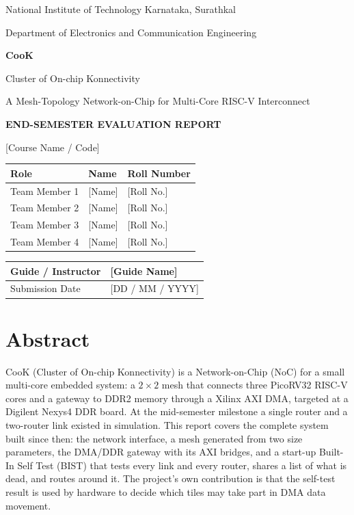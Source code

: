 \documentclass[11pt,a4paper]{article}
\begin{document}
\begin{titlepage}
\centering
{\large National Institute of Technology Karnataka, Surathkal\par}
{\large Department of Electronics and Communication Engineering\par}
\vspace{2.5cm}
{\Huge\bfseries CooK\par}
\vspace{0.3cm}
{\Large Cluster of On-chip Konnectivity\par}
\vspace{0.6cm}
{\large A Mesh-Topology Network-on-Chip for Multi-Core RISC-V Interconnect\par}
\vspace{1.5cm}
{\Large\bfseries END-SEMESTER EVALUATION REPORT\par}
\vspace{0.4cm}
{[Course Name / Code]\par}
\vspace{1.5cm}
\begin{tabular}{|l|l|l|}
\hline
\textbf{Role} & \textbf{Name} & \textbf{Roll Number} \\ \hline
Team Member 1 & [Name] & [Roll No.] \\ \hline
Team Member 2 & [Name] & [Roll No.] \\ \hline
Team Member 3 & [Name] & [Roll No.] \\ \hline
Team Member 4 & [Name] & [Roll No.] \\ \hline
\end{tabular}

\vspace{1cm}
\begin{tabular}{|l|l|}
\hline
Guide / Instructor & [Guide Name] \\ \hline
Submission Date & [DD / MM / YYYY] \\ \hline
\end{tabular}
\vfill
\end{titlepage}

\tableofcontents
\newpage

\section{Abstract}

CooK (Cluster of On-chip Konnectivity) is a Network-on-Chip (NoC) for a small
multi-core embedded system: a $2\times2$ mesh that connects three PicoRV32
RISC-V cores and a gateway to DDR2 memory through a Xilinx AXI DMA, targeted at
a Digilent Nexys4 DDR board. At the mid-semester milestone a single router and
a two-router link existed in simulation. This report covers the complete
system built since then: the network interface, a mesh generated from two size
parameters, the DMA/DDR gateway with its AXI bridges, and a start-up Built-In
Self Test (BIST) that tests every link and every router, shares a list of what
is dead, and routes around it. The project's own contribution is that the
self-test result is used by hardware to decide which tiles may take part in
DMA data movement.
\end{document}
